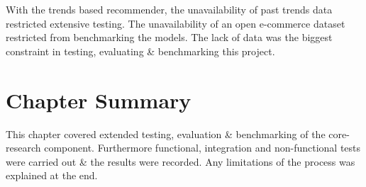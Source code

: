 With the trends based recommender, the unavailability of past trends data restricted extensive testing. The unavailability of an open e-commerce dataset restricted from benchmarking the models. The lack of data was the biggest constraint in testing, evaluating \& benchmarking this project.

\section{Chapter Summary}
This chapter covered extended testing, evaluation \& benchmarking of the core-research component. Furthermore functional, integration and non-functional tests were carried out \& the results were recorded. Any limitations of the process was explained at the end.